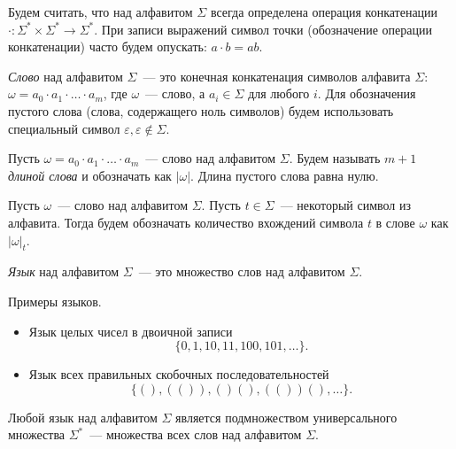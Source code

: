 Будем считать, что над алфавитом $\Sigma$ всегда определена операция конкатенации $\cdot: \Sigma^* \times \Sigma^* \to \Sigma^*$.
При записи выражений символ точки (обозначение операции конкатенации) часто будем опускать: $a \cdot b = ab$.

\begin{definition}[Слово]
    \emph{Слово} над алфавитом $\Sigma$~--- это конечная конкатенация символов алфавита $\Sigma$: $\omega = a_0 \cdot a_1 \cdot \dots \cdot a_m$, где $\omega$~--- слово, а $a_i \in \Sigma$ для любого $i$.
    Для обозначения пустого слова (слова, содержащего ноль символов) будем использовать специальный символ $\varepsilon, \varepsilon \notin \Sigma$.
\end{definition}

\begin{definition}
    Пусть $\omega = a_0 \cdot a_1 \cdot \dots \cdot a_m$~--- слово над алфавитом $\Sigma$.
    Будем называть $m + 1$ \emph{длиной слова} и обозначать как $|\omega|$.
    Длина пустого слова равна нулю.
\end{definition}

\begin{definition}
    Пусть $\omega$~--- слово над алфавитом $\Sigma$. Пусть $t \in \Sigma$~--- некоторый символ из алфавита.
    Тогда будем обозначать количество вхождений символа $t$ в слове $\omega$ как $|\omega|_t$.
\end{definition}

\begin{definition}[Язык]
    \emph{Язык} над алфавитом $\Sigma$~--- это множество слов над алфавитом $\Sigma$.
\end{definition}

\begin{example}
    Примеры языков.

    \begin{itemize}
        \item Язык целых чисел в двоичной записи 
              \[\{0, 1, 10, 11, 100, 101, \dots\}.\]
        \item Язык всех правильных скобочных последовательностей
              \[\{(), (()), ()(), (())(), \dots\}.\]
    \end{itemize}
\end{example}

Любой язык над алфавитом $\Sigma$ является подмножеством универсального множества $\Sigma^*$~--- множества всех слов над алфавитом $\Sigma$.

